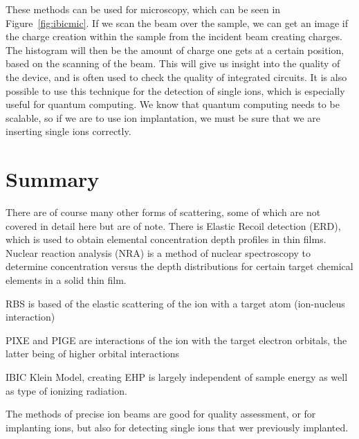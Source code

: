 These methods can be used for microscopy, which can be seen in Figure~\ref{fig:ibicmic}.
If we scan the beam over the sample, we can get an image if the charge creation within the sample from the incident beam creating charges.
The histogram will then be the amount of charge one gets at a certain position, based on the scanning of the beam.
This will give us insight into the quality of the device, and is often used to check the quality of integrated circuits.
It is also possible to use this technique for the detection of single ions, which is especially useful for quantum computing.
We know that quantum computing needs to be scalable, so if we are to use ion implantation, we must be sure that we are inserting single ions correctly.

\section{Summary}
There are of course many other forms of scattering, some of which are not covered in detail here but are of note.
There is Elastic Recoil detection (ERD), which is used to obtain elemental concentration depth profiles in thin films.
Nuclear reaction analysis (NRA) is a method of nuclear spectroscopy to determine concentration versus the depth distributions for certain target chemical elements in a solid thin film.
\begin{myitemize}
	\item RBS is based of the elastic scattering of the ion with a target atom (ion-nucleus interaction)
	\item PIXE and PIGE are interactions of the ion with the target electron orbitals, the latter being of higher orbital interactions
	\item IBIC Klein Model, creating EHP is largely independent of sample energy as well as type of ionizing radiation.
	\item The methods of precise ion beams are good for quality assessment, or for implanting ions, but also for detecting single ions that wer previously implanted.
\end{myitemize}
